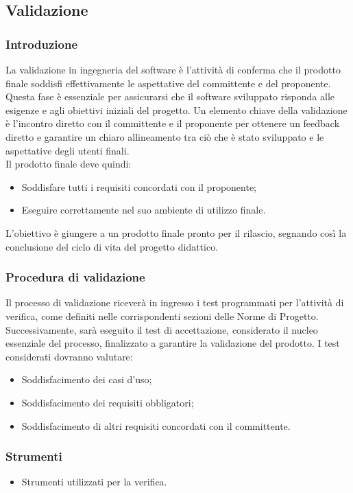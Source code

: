 \subsection{Validazione}
\subsubsection{Introduzione}

La validazione in ingegneria del software è l'attività di conferma che il prodotto finale soddisfi effettivamente le aspettative del committente e del proponente. Questa fase è essenziale per assicurarsi che il software sviluppato risponda alle esigenze e agli obiettivi iniziali del progetto.
Un elemento chiave della validazione è l'incontro diretto con il committente e il proponente per ottenere un feedback diretto e garantire un chiaro allineamento tra ciò che è stato sviluppato e le aspettative degli utenti finali.
\\Il prodotto finale deve quindi:
\begin{itemize}
    \item Soddisfare tutti i requisiti concordati con il proponente;
    \item Eseguire correttamente nel suo ambiente di utilizzo finale.
\end{itemize}
L'obiettivo è giungere a un prodotto finale pronto per il rilascio, segnando così la conclusione del ciclo di vita del progetto didattico.
\subsubsection{Procedura di validazione}
Il processo di validazione riceverà in ingresso i test programmati per l'attività di verifica, come definiti nelle corrispondenti sezioni delle Norme di Progetto. Successivamente, sarà eseguito il test di accettazione, considerato il nucleo essenziale del processo, finalizzato a garantire la validazione del prodotto.
I test considerati dovranno valutare:
\begin{itemize}
    \item Soddisfacimento dei casi d’uso;
    \item Soddisfacimento dei requisiti obbligatori;
    \item Soddisfacimento di altri requisiti concordati con il committente.
\end{itemize}

\subsubsection{Strumenti}
\begin{itemize}
    \item Strumenti utilizzati per la verifica.
\end{itemize}

